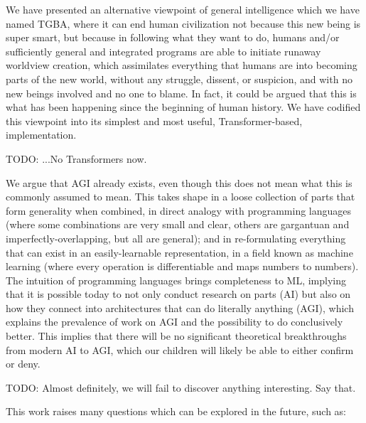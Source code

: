 \documentclass{article}
\begin{document}
We have presented an alternative viewpoint of general intelligence which we have named TGBA, where it can end human civilization not because this new being is super smart, but because in following what they want to do, humans and/or sufficiently general and integrated programs are able to initiate runaway worldview creation, which assimilates everything that humans are into becoming parts of the new world, without any struggle, dissent, or suspicion, and with no new beings involved and no one to blame. In fact, it could be argued that this is what has been happening since the beginning of human history. We have codified this viewpoint into its simplest and most useful, Transformer-based, implementation.

    TODO: ...No Transformers now.

We argue that AGI already exists, even though this does not mean what this is commonly assumed to mean. This takes shape in a loose collection of parts that form generality when combined, in direct analogy with programming languages (where some combinations are very small and clear, others are gargantuan and imperfectly-overlapping, but all are general); and in re-formulating everything that can exist in an easily-learnable representation, in a field known as machine learning (where every operation is differentiable and maps numbers to numbers). The intuition of programming languages brings completeness to ML, implying that it is possible today to not only conduct research on parts (AI) but also on how they connect into architectures that can do literally anything (AGI), which explains the prevalence of work on AGI and the possibility to do conclusively better. This implies that there will be no significant theoretical breakthroughs from modern AI to AGI, which our children will likely be able to either confirm or deny.

    TODO: Almost definitely, we will fail to discover anything interesting. Say that.

This work raises many questions which can be explored in the future, such as:
\end{document}
